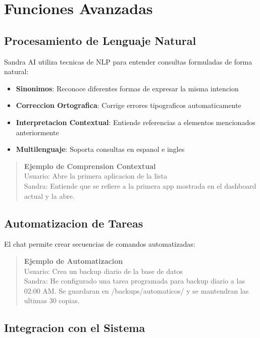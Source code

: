 \section{Funciones Avanzadas}
\label{sec:funciones-avanzadas}

\subsection{Procesamiento de Lenguaje Natural}

Sandra AI utiliza tecnicas de NLP para entender consultas formuladas de forma natural:

\begin{itemize}[leftmargin=*]
    \item \textbf{Sinonimos}: Reconoce diferentes formas de expresar la misma intencion
    \item \textbf{Correccion Ortografica}: Corrige errores tipograficos automaticamente
    \item \textbf{Interpretacion Contextual}: Entiende referencias a elementos mencionados anteriormente
    \item \textbf{Multilenguaje}: Soporta consultas en espanol e ingles
\end{itemize}

\begin{quote}
\textbf{Ejemplo de Comprension Contextual}\\
Usuario: Abre la primera aplicacion de la lista\\
Sandra: Entiende que se refiere a la primera app mostrada en el dashboard actual y la abre.
\end{quote}

\subsection{Automatizacion de Tareas}

El chat permite crear secuencias de comandos automatizadas:

\begin{quote}
\textbf{Ejemplo de Automatizacion}\\
Usuario: Crea un backup diario de la base de datos\\
Sandra: He configurado una tarea programada para backup diario a las 02:00 AM. Se guardaran en /backups/automaticos/ y se mantendran las ultimas 30 copias.
\end{quote}

\subsection{Integracion con el Sistema}

